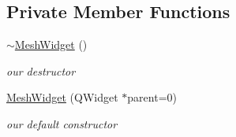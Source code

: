 \subsection*{Private Member Functions}
\begin{DoxyCompactItemize}
\item 
\hypertarget{class_mesh_widget_ab914a1597ebaa0b2679f9ae32226ab3f}{\hyperlink{class_mesh_widget_ab914a1597ebaa0b2679f9ae32226ab3f}{$\sim$\-Mesh\-Widget} ()}\label{class_mesh_widget_ab914a1597ebaa0b2679f9ae32226ab3f}

\begin{DoxyCompactList}\small\item\em our destructor \end{DoxyCompactList}\item 
\hypertarget{class_mesh_widget_a2a83b4ce21ff9a33d5b7315faefb8fed}{\hyperlink{class_mesh_widget_a2a83b4ce21ff9a33d5b7315faefb8fed}{Mesh\-Widget} (Q\-Widget $\ast$parent=0)}\label{class_mesh_widget_a2a83b4ce21ff9a33d5b7315faefb8fed}

\begin{DoxyCompactList}\small\item\em our default constructor \end{DoxyCompactList}\end{DoxyCompactItemize}
